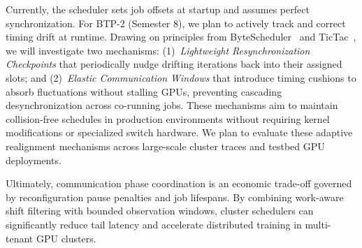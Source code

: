 \documentclass[conference]{IEEEtran}
\begin{document}
Currently, the scheduler sets job offsets at startup and assumes perfect synchronization. For BTP-2 (Semester 8), we plan to actively track and correct timing drift at runtime. Drawing on principles from ByteScheduler~\cite{bytescheduler} and TicTac~\cite{tictac}, we will investigate two mechanisms: (1)~\emph{Lightweight Resynchronization Checkpoints} that periodically nudge drifting iterations back into their assigned slots; and (2)~\emph{Elastic Communication Windows} that introduce timing cushions to absorb fluctuations without stalling GPUs, preventing cascading desynchronization across co-running jobs. These mechanisms aim to maintain collision-free schedules in production environments without requiring kernel modifications or specialized switch hardware. We plan to evaluate these adaptive realignment mechanisms across large-scale cluster traces and testbed GPU deployments.

Ultimately, communication phase coordination is an economic trade-off governed by reconfiguration pause penalties and job lifespans. By combining work-aware shift filtering with bounded observation windows, cluster schedulers can significantly reduce tail latency and accelerate distributed training in multi-tenant GPU clusters.
\end{document}
